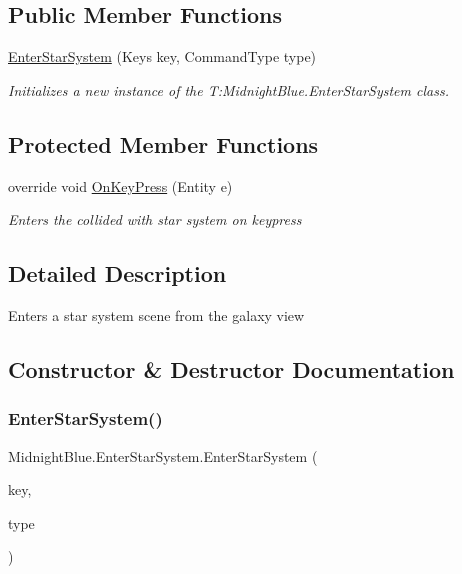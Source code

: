 \subsection*{Public Member Functions}
\begin{DoxyCompactItemize}
\item 
\hyperlink{class_midnight_blue_1_1_enter_star_system_a6bea0a7daba691c1b46238114b347377}{Enter\+Star\+System} (Keys key, Command\+Type type)
\begin{DoxyCompactList}\small\item\em Initializes a new instance of the T\+:\+Midnight\+Blue.\+Enter\+Star\+System class. \end{DoxyCompactList}\end{DoxyCompactItemize}
\subsection*{Protected Member Functions}
\begin{DoxyCompactItemize}
\item 
override void \hyperlink{class_midnight_blue_1_1_enter_star_system_a1cf84a93760ef0cda918915ec8acfa4d}{On\+Key\+Press} (Entity e)
\begin{DoxyCompactList}\small\item\em Enters the collided with star system on keypress \end{DoxyCompactList}\end{DoxyCompactItemize}


\subsection{Detailed Description}
Enters a star system scene from the galaxy view 



\subsection{Constructor \& Destructor Documentation}
\hypertarget{class_midnight_blue_1_1_enter_star_system_a6bea0a7daba691c1b46238114b347377}{}\label{class_midnight_blue_1_1_enter_star_system_a6bea0a7daba691c1b46238114b347377} 
\subsubsection{\texorpdfstring{Enter\+Star\+System()}{EnterStarSystem()}}
{\footnotesize\ttfamily Midnight\+Blue.\+Enter\+Star\+System.\+Enter\+Star\+System (\begin{DoxyParamCaption}\item[{Keys}]{key,  }\item[{Command\+Type}]{type }\end{DoxyParamCaption})\hspace{0.3cm}{\ttfamily [inline]}}



